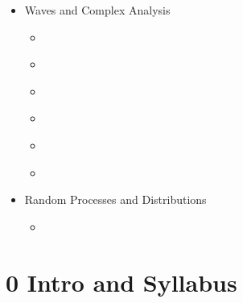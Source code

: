 \documentclass[letterpaper,10pt,english]{jupyterBook}
\begin{document}
\begin{itemize}
\item {} 
 \sphinxhyphen{} Waves and Complex Analysis

\begin{itemize}
\item {} 
\sphinxAtStartPar
{\hyperref[\detokenize{content/3_waves/waves_intro::doc}]{}}

\item {} 
\sphinxAtStartPar
{\hyperref[\detokenize{content/3_waves/normal_modes::doc}]{}}

\item {} 
\sphinxAtStartPar
{\hyperref[\detokenize{content/3_waves/mech_waves::doc}]{}}

\item {} 
\sphinxAtStartPar
{\hyperref[\detokenize{content/3_waves/wave_examples::doc}]{}}

\item {} 
\sphinxAtStartPar
{\hyperref[\detokenize{content/3_waves/complex::doc}]{}}

\item {} 
\sphinxAtStartPar
{\hyperref[\detokenize{content/3_waves/DFT_FFT::doc}]{}}

\end{itemize}
\end{itemize}
\begin{itemize}
\item {} 
 \sphinxhyphen{} Random Processes and Distributions

\begin{itemize}
\item {} 
\sphinxAtStartPar
{\hyperref[\detokenize{content/4_distributions/distributions_intro::doc}]{}}

\end{itemize}
\end{itemize}

\sphinxstepscope


\part{0 \sphinxhyphen{} Intro and Syllabus}
\end{document}

